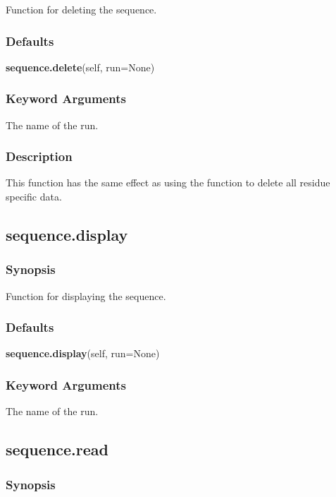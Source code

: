 Function for deleting the sequence.

\subsubsection{Defaults}

\textsf{\textbf{sequence.delete}(self, run=None)}


\subsubsection{Keyword Arguments}


  The name of the run.

\subsubsection{Description}

This function has the same effect as using the 
 function to delete all residue
specific data.


\newpage

\subsection{sequence.display}


\subsubsection{Synopsis}

Function for displaying the sequence.

\subsubsection{Defaults}

\textsf{\textbf{sequence.display}(self, run=None)}


\subsubsection{Keyword Arguments}


  The name of the run.


\newpage

\subsection{sequence.read}


\subsubsection{Synopsis}


